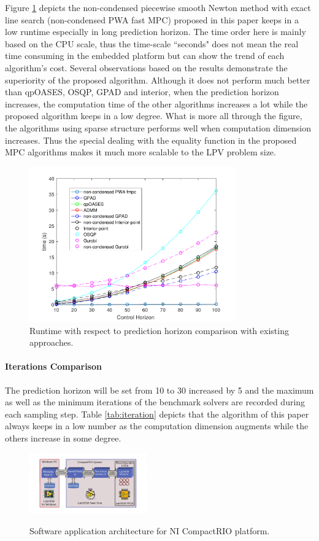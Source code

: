 \documentclass[journal]{IEEEtran}
\begin{document}
Figure \ref{fig:compare} depicts the non-condensed piecewise smooth Newton method with exact line search (non-condensed PWA fast MPC) proposed in this paper keeps in a low runtime especially in long prediction horizon. The time order here is mainly based on the CPU scale, thus the time-scale ``seconds" does not mean the real time consuming in the embedded platform but can show the trend of each algorithm's cost.  Several observations based on the results demonstrate the superiority of the proposed algorithm. Although it does not perform much better than qpOASES, OSQP, GPAD and interior, when the prediction horizon increases, the computation time of the other algorithms increases a lot while the proposed algorithm keeps in a low degree. What is more all through the figure, the algorithms using sparse structure performs well when computation dimension increases.  Thus the special dealing with the equality function in the proposed MPC algorithms makes it much more scalable to the LPV problem size.
\begin{figure}
	\centering
		\includegraphics[width=3.5in]{picture/compare.pdf}
		\caption{Runtime with respect to prediction horizon comparison with existing approaches.}\label{fig:compare}
\end{figure}

\paragraph{Iterations Comparison}
The prediction horizon  will be set from 10 to 30 increased by 5 and the maximum as well as the minimum iterations of the benchmark solvers  are recorded during each sampling step. Table \ref{tab:iteration} depicts that the algorithm of this paper always keeps in a low number as the computation dimension augments while the others increase in some degree.


\begin{figure}
	\centering
	\includegraphics[width=0.45\textwidth]{picture/1.jpg}\\
	\caption{Software application architecture for NI CompactRIO platform.}\label{fig:clabview1}
\end{figure}
\end{document}
